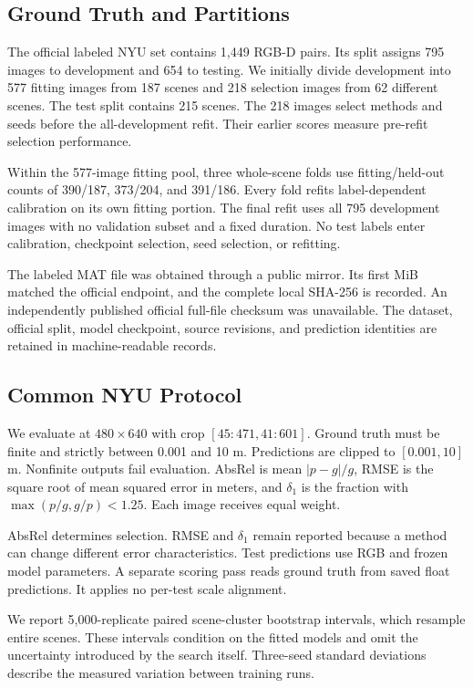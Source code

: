 \documentclass[10pt,twocolumn,letterpaper]{article}
\begin{document}
\subsection{Ground Truth and Partitions}
The official labeled NYU set contains 1,449 RGB-D pairs. Its split assigns 795 images to development and 654 to testing. We initially divide development into 577 fitting images from 187 scenes and 218 selection images from 62 different scenes. The test split contains 215 scenes. The 218 images select methods and seeds before the all-development refit. Their earlier scores measure pre-refit selection performance.

Within the 577-image fitting pool, three whole-scene folds use fitting/held-out counts of 390/187, 373/204, and 391/186. Every fold refits label-dependent calibration on its own fitting portion. The final refit uses all 795 development images with no validation subset and a fixed duration. No test labels enter calibration, checkpoint selection, seed selection, or refitting.

The labeled MAT file was obtained through a public mirror. Its first MiB matched the official endpoint, and the complete local SHA-256 is recorded. An independently published official full-file checksum was unavailable. The dataset, official split, model checkpoint, source revisions, and prediction identities are retained in machine-readable records.

\subsection{Common NYU Protocol}
We evaluate at $480\times640$ with crop $[45:471,41:601]$. Ground truth must be finite and strictly between 0.001 and 10 m. Predictions are clipped to $[0.001,10]$ m. Nonfinite outputs fail evaluation. AbsRel is mean $|p-g|/g$, RMSE is the square root of mean squared error in meters, and $\delta_1$ is the fraction with $\max(p/g,g/p)<1.25$. Each image receives equal weight.

AbsRel determines selection. RMSE and $\delta_1$ remain reported because a method can change different error characteristics. Test predictions use RGB and frozen model parameters. A separate scoring pass reads ground truth from saved float predictions. It applies no per-test scale alignment.

We report 5,000-replicate paired scene-cluster bootstrap intervals, which resample entire scenes. These intervals condition on the fitted models and omit the uncertainty introduced by the search itself. Three-seed standard deviations describe the measured variation between training runs.
\end{document}
